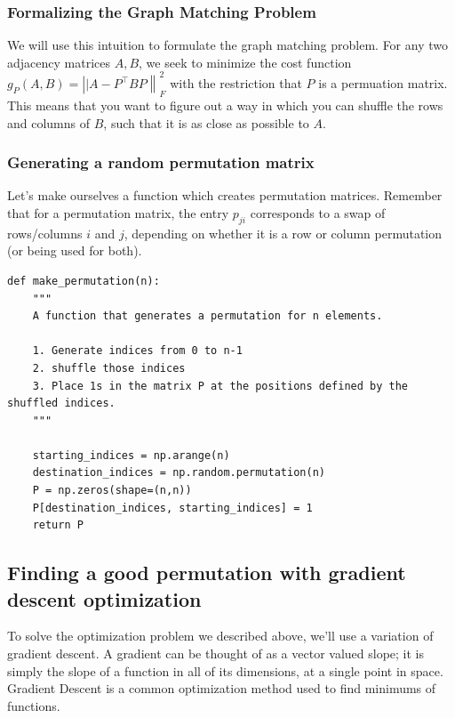 \subsubsection*{Formalizing the Graph Matching Problem}

We will use this intuition to formulate the graph matching problem. For any two adjacency matrices $A, B$, we seek to minimize the cost function $g_P(A,B) = \left|| A - P^\top BP\right\|_F^2$ with the restriction that $P$ is a permuation matrix. This means that you want to figure out a way in which you can shuffle the rows and columns of $B$, such that it is as close as possible to $A$.
\subsubsection*{Generating a random permutation matrix}

Let's make ourselves a function which creates permutation matrices. Remember that for a permutation matrix, the entry $p_{ji}$ corresponds to a swap of rows/columns $i$ and $j$, depending on whether it is a row or column permutation (or being used for both).

\begin{lstlisting}[style=python]
def make_permutation(n):
    """
    A function that generates a permutation for n elements.
    
    1. Generate indices from 0 to n-1
    2. shuffle those indices
    3. Place 1s in the matrix P at the positions defined by the shuffled indices.
    """
    
    starting_indices = np.arange(n)
    destination_indices = np.random.permutation(n)
    P = np.zeros(shape=(n,n))
    P[destination_indices, starting_indices] = 1
    return P
\end{lstlisting}

\subsection{Finding a good permutation with gradient descent optimization}

To solve the optimization problem we described above, we'll use a variation of gradient descent. A gradient can be thought of as a vector valued slope; it is simply the slope of a function in all of its dimensions, at a single point in space. Gradient Descent is a common optimization method used to find minimums of functions.

